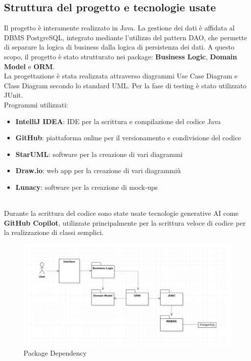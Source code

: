 \documentclass{article}
\begin{document}
\subsection{Struttura del progetto e tecnologie usate}
Il progetto è interamente realizzato in Java. La gestione dei dati è affidata al DBMS PostgreSQL, integrato mediante l'utilizzo del pattern DAO, che permette di separare la logica di business dalla logica di persistenza dei dati. A questo scopo, il progetto è stato strutturato nei package: \textbf{Business Logic}, \textbf{Domain Model} e \textbf{ORM}.\\ La progettazione è stata realizzata attraverso diagrammi Use Case Diagram e Class Diagram secondo lo standard UML. Per la fase di testing è stato utilizzato JUnit. \\
Programmi utilizzati:
\begin{itemize}
    \item {\textbf{IntelliJ IDEA}}: IDE per la scrittura e compilazione del codice Java
    \item {\textbf{GitHub}}: piattaforma online per il versionamento e condivisione del codice
    \item {\textbf{StarUML}}: software per la creazione di vari diagrammi
    \item {\textbf{Draw.io}}: web app per la creazione di vari diagrammiù
    \item {\textbf{Lunacy}}: software per la creazione di mock-ups
\end{itemize}
\\
Durante la scrittura del codice sono state usate tecnologie generative AI come \textbf{GitHub Copilot}, utilizzate principalmente per la scrittura veloce di codice per la realizzazione di classi semplici. \\

\begin{figure}[!h]
    \centering
    \includegraphics[width=0.9\linewidth]{imgs/PackageDependecy.png}
    \caption{Package Dependency}
    \label{PackageDependecy}
\end{figure}
\end{document}

